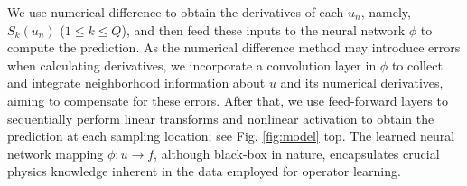 
We use numerical difference to obtain the derivatives of each $u_n$, namely, $S_k(u_n)$ ($1 \le k \le Q$), and then feed these inputs to the neural network $\phi$ to compute the prediction. 
As the numerical difference method may introduce errors when calculating derivatives, we incorporate a convolution layer in $\phi$ to collect and integrate neighborhood information about $u$ and its numerical derivatives, aiming to compensate for these errors. After that, we use feed-forward layers to sequentially perform linear transforms and nonlinear activation to obtain the prediction at each sampling location; see Fig. \ref{fig:model} top. The learned neural network mapping $\phi: u \rightarrow f$, although black-box in nature,
encapsulates crucial physics knowledge inherent in the data employed for operator learning. %










